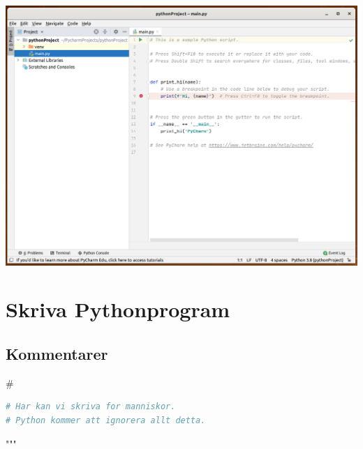 \begin{frame}
  \centering
  \includegraphics[height=\textheight]{figs/pycharm.png}
\end{frame}


\section{Skriva Pythonprogram}

\subsection{Kommentarer}

\begin{frame}
  \begin{center}
    \huge\#
  \end{center}
\end{frame}

\begin{frame}[fragile]
  \begin{example}
    \begin{lstlisting}[language=python]
# Har kan vi skriva for manniskor.
# Python kommer att ignorera allt detta.
    \end{lstlisting}
  \end{example}
\end{frame}

\begin{frame}
  \begin{center}
    \huge """
  \end{center}
\end{frame}

